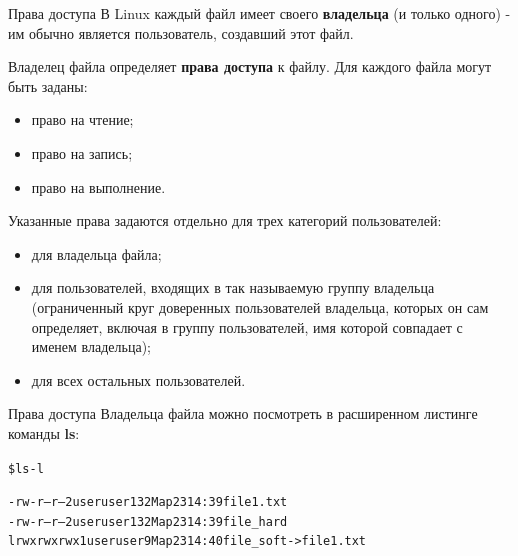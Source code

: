 \documentclass[xcolor=table]{beamer}
\begin{document}
\begin{frame}[fragile]{Права доступа}
	В Linux каждый файл имеет своего \textbf{владельца} (и только одного) - им обычно является пользователь, создавший этот файл.

	\medskip
	Владелец файла определяет \textbf{права доступа} к файлу. Для каждого файла могут быть заданы: 
	\begin{itemize}
		\item право на чтение;
		\item право на запись;
		\item право на выполнение. 
	\end{itemize}

	Указанные права задаются отдельно для трех категорий пользователей:
	\begin{itemize}
		\item для владельца файла;
		\item для пользователей, входящих в так называемую группу владельца (ограниченный круг доверенных пользователей владельца, которых он сам определяет, включая в группу пользователей, имя которой совпадает с именем владельца);
		\item для всех остальных пользователей.
	\end{itemize}	
\end{frame}

\begin{frame}[fragile]{Права доступа}
	Владельца файла можно посмотреть в расширенном листинге команды \textbf{ls}:

	\begin{alltt}
		\$ ls -l

		-rw-r--r-- 2 user user 132 Мар 23 14:39 file1.txt
		-rw-r--r-- 2 user user 132 Мар 23 14:39 file_hard
		lrwxrwxrwx 1 user user 9 Мар 23 14:40 file_soft -> file1.txt		
	\end{alltt}
\end{frame}
\end{document}
